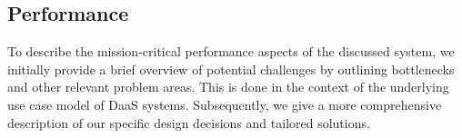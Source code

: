 \documentclass[runningheads]{llncs}
\begin{document}
\subsection{Performance}
%
%

To describe the mission-critical performance aspects of the discussed system,
we initially provide a brief overview of potential challenges
by outlining bottlenecks and other relevant problem areas.
This is done in the context of the underlying use case model of DaaS systems.
Subsequently, we give a more comprehensive description
of our specific design decisions and tailored solutions.
\end{document}
